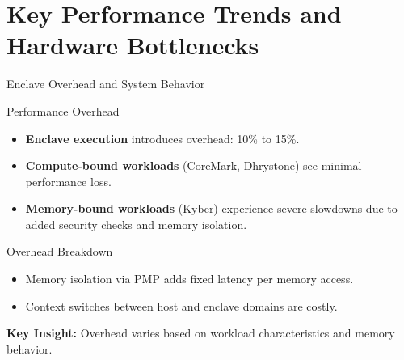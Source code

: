\documentclass[aspectratio=169]{beamer}
\begin{document}
\section{Key Performance Trends and Hardware Bottlenecks}
\label{sec:synthesis}

\begin{frame}{Enclave Overhead and System Behavior}
\small
\begin{block}{Performance Overhead}
\begin{itemize}
    \item \textbf{Enclave execution} introduces overhead: 10\% to 15\%.
    \item \textbf{Compute-bound workloads} (CoreMark, Dhrystone) see minimal performance loss.
    \item \textbf{Memory-bound workloads} (Kyber) experience severe slowdowns due to added security checks and memory isolation.
\end{itemize}
\end{block}

\begin{block}{Overhead Breakdown}
\begin{itemize}
    \item Memory isolation via PMP adds fixed latency per memory access.
    \item Context switches between host and enclave domains are costly.
\end{itemize}
\end{block}

\centering
\textbf{Key Insight:} Overhead varies based on workload characteristics and memory behavior.
\end{frame}
\end{document}
